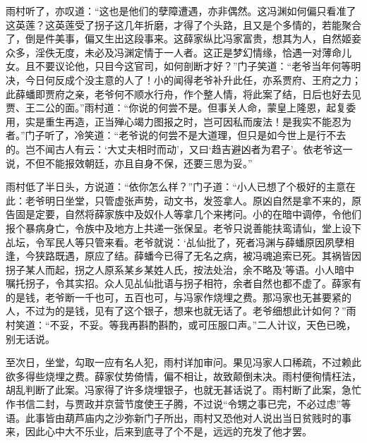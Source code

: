 \documentclass[12pt,oneside]{book}
\begin{document}
雨村听了，亦叹道：“这也是他们的孽障遭遇，亦非偶然。这冯渊如何偏只看准了这英莲？这英莲受了拐子这几年折磨，才得了个头路，且又是个多情的，若能聚合了，倒是件美事，偏又生出这段事来。这薛家纵比冯家富贵，想其为人，自然姬妾众多，淫佚无度，未必及冯渊定情于一人者。这正是梦幻情缘，恰遇一对薄命儿女。且不要议论他，只目今这官司，如何剖断才好？”门子笑道：“老爷当年何等明决，今日何反成个没主意的人了！小的闻得老爷补升此任，亦系贾府、王府之力；此薛蟠即贾府之亲，老爷何不顺水行舟，作个整人情，将此案了结，日后也好去见贾、王二公的面。”雨村道：“你说的何尝不是。但事关人命，蒙皇上隆恩，起复委用，实是重生再造，正当殚心竭力图报之时，岂可因私而废法！是我实不能忍为者。”门子听了，冷笑道：“老爷说的何尝不是大道理，但只是如今世上是行不去的。岂不闻古人有云：‘大丈夫相时而动’，又曰‘趋吉避凶者为君子’。依老爷这一说，不但不能报效朝廷，亦且自身不保，还要三思为妥。”

雨村低了半日头，方说道：“依你怎么样？”门子道：“小人已想了个极好的主意在此：老爷明日坐堂，只管虚张声势，动文书，发签拿人。原凶自然是拿不来的，原告固是定要，自然将薛家族中及奴仆人等拿几个来拷问。小的在暗中调停，令他们报个暴病身亡，令族中及地方上共递一张保呈。老爷只说善能扶鸾请仙，堂上设下乩坛，令军民人等只管来看。老爷就说：‘乩仙批了，死者冯渊与薛蟠原因夙孽相逢，今狭路既遇，原应了结。薛蟠今已得了无名之病，被冯魂追索已死。其祸皆因拐子某人而起，拐之人原系某乡某姓人氏，按法处治，余不略及’等语。小人暗中嘱托拐子，令其实招。众人见乩仙批语与拐子相符，余者自然也都不虚了。薛家有的是钱，老爷断一千也可，五百也可，与冯家作烧埋之费。那冯家也无甚要紧的人，不过为的是钱，见有了这个银子，想来也就无话了。老爷细想此计如何？”雨村笑道：“不妥，不妥。等我再斟酌斟酌，或可压服口声。”二人计议，天色已晚，别无话说。

至次日，坐堂，勾取一应有名人犯，雨村详加审问。果见冯家人口稀疏，不过赖此欲多得些烧埋之费。薛家仗势倚情，偏不相让，故致颠倒未决。雨村便徇情枉法，胡乱判断了此案。冯家得了许多烧埋银子，也就无甚话说了。雨村断了此案，急忙作书信二封，与贾政并京营节度使王子腾，不过说“令甥之事已完，不必过虑”等语。此事皆由葫芦庙内之沙弥新门子所出，雨村又恐他对人说出当日贫贱时的事来，因此心中大不乐业，后来到底寻了个不是，远远的充发了他才罢。
\end{document}
